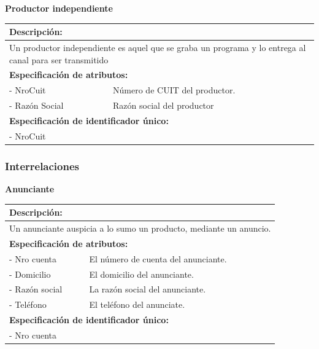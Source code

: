 \documentclass[a4paper,10pt]{article}
\begin{document}
      \begin{flushleft}
      \begin{large} \bf{Productor independiente} \end{large}
    \end{flushleft}
      \begin{tabular}{| p{3cm} | p{9cm} |}
	\hline
	\multicolumn{2}{|l|}{\bf{Descripci\'on:}} \\
	\hline
	\multicolumn{2}{|l|}{Un productor independiente es aquel que se graba un programa y lo entrega al canal para ser transmitido} \\
	\hline	
	\multicolumn{2}{|l|}{\bf{Especificaci\'on de atributos:}} \\
	\hline
	- NroCuit & N\'umero de CUIT del productor. \\
	\hline \hline
	- Raz\'on \newline Social & Raz\'on social del productor\\
	\hline
	\multicolumn{2}{|l|}{\bf{Especificaci\'on de identificador \'unico:}} \\
	\hline
	\multicolumn{2}{|l|}{- NroCuit} \\
	\hline
      \end{tabular} 
   
   
    \subsubsection{Interrelaciones}
    
    \begin{flushleft}
      \begin{large} \bf{Anunciante} \end{large}
    \end{flushleft}
      \begin{tabular}{| p{2cm} | p{9cm} |}
	\hline
	\multicolumn{2}{|l|}{\bf{Descripci\'on:}} \\
	\hline
	\multicolumn{2}{|l|}{Un anunciante auspicia a lo sumo un producto, mediante un anuncio.} \\
	\hline	
	\multicolumn{2}{|l|}{\bf{Especificaci\'on de atributos:}} \\
	\hline
	- Nro cuenta & El n\'umero de cuenta del anunciante. \\
	\hline \hline
	- Domicilio & El domicilio del anunciante. \\
	\hline \hline
	- Raz\'on \newline social & La raz\'on social del anunciante. \\
	\hline \hline
	- Tel\'efono & El tel\'efono del anunciate. \\
	\hline
	\multicolumn{2}{|l|}{\bf{Especificaci\'on de identificador \'unico:}} \\
	\hline
	\multicolumn{2}{|l|}{- Nro cuenta} \\
	\hline
      \end{tabular}
\end{document}
